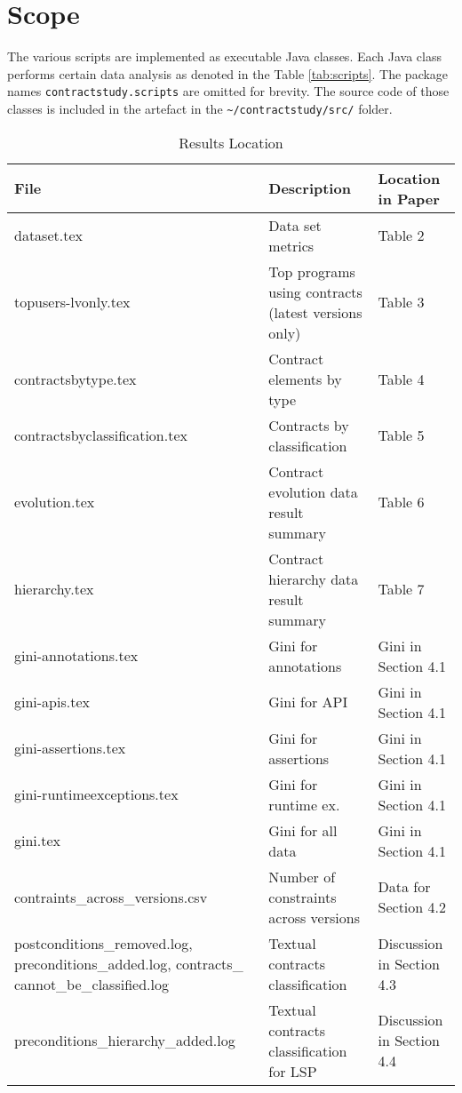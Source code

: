 \documentclass[a4paper,UKenglish]{darts}
\newenvironment{scope}{\section{Scope}}{}
\begin{document}
\begin{scope}
  The various scripts are implemented as executable Java classes. Each Java class performs certain data analysis as denoted in the Table \ref{tab:scripts}. The package names \texttt{contractstudy.scripts} are omitted for brevity.  The source code of those classes is included in the artefact in the \texttt{\textasciitilde/contractstudy/src/} folder. 
  
    \begin{table}[t]
  	\centering
  	\caption{Results Location}
  	\label{tab:results_location}
  	\begin{tabular}{p{5cm} p{4cm} p{4cm} } \hline
  		File & Description & Location in Paper \\ \hline
  		
  		dataset.tex & Data set metrics & Table 2 \\
  		topusers-lvonly.tex & Top programs using contracts (latest versions only) & Table 3 \\
  		contractsbytype.tex & Contract elements by type & Table 4  \\
  		contractsbyclassification.tex & Contracts by classification & Table 5 \\
  		evolution.tex & Contract evolution data result summary & Table 6 \\
  		hierarchy.tex & Contract hierarchy data result summary & Table 7 \\
  		
  		gini-annotations.tex & Gini for annotations & Gini in Section 4.1 \\
  		gini-apis.tex & Gini for API & Gini in Section 4.1 \\
  		gini-assertions.tex & Gini for assertions & Gini in Section 4.1 \\
  		gini-runtimeexceptions.tex & Gini for runtime ex. & Gini in Section 4.1 \\
  		gini.tex & Gini for all data & Gini in Section 4.1 \\
  		contraints\_across\_versions.csv & Number of constraints across versions & Data for Section 4.2\\
  		postconditions\_removed.log, preconditions\_added.log, contracts\_ cannot\_be\_classified.log & Textual contracts classification & Discussion in Section 4.3 \\
  		preconditions\_hierarchy\_added.log & Textual contracts classification for LSP & Discussion in Section 4.4 \\
  		\hline
  	\end{tabular}
  \end{table}



\end{scope}
\end{document}
